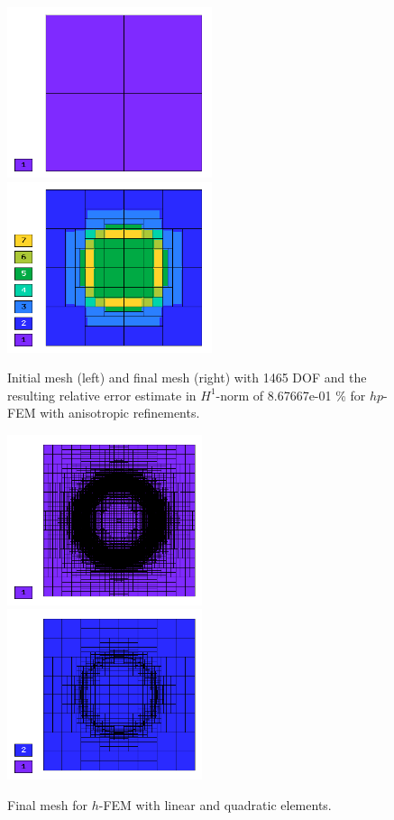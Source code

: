 \begin{figure}[!ht]
\centering
\includegraphics[height=5cm]{nist/nist-9/mesh_hp_aniso_init.png}\ \
\includegraphics[height=5cm]{nist/nist-9/mesh_hp_aniso.png}
\caption{Initial mesh (left) and final mesh (right) with 1465 DOF and the resulting relative error estimate in $H^1$-norm of 8.67667e-01 \% for $hp$-FEM with anisotropic refinements.}
\label{fig:nist-9-hp-aniso}
\end{figure}

\begin{figure}[!ht]
\centering
\includegraphics[height=5cm]{nist/nist-9/mesh_h1_aniso.png}\ \
\includegraphics[height=5cm]{nist/nist-9/mesh_h2_aniso.png}
\caption{Final mesh for $h$-FEM with linear and quadratic elements.}
\label{fig:nist-9-h-aniso}
\end{figure}

